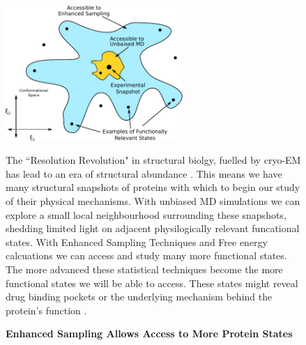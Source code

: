 \begin{figure}
	\label{Enhanced_sampling_framework}
	\begin{center}
		\includegraphics[width=0.6\textwidth]{figures/opening/MD_accessibility.pdf}
	\end{center}
	\captionsetup{singlelinecheck = false, justification=raggedright}
	\caption[Enhanced Sampling Allows Access to More Protein States] {\textbf{Enhanced Sampling Allows Access to More Protein States}}{The ``Resolution Revolution" in structural biolgy, fuelled by cryo-EM has lead to an era of structural abundance \cite{kuhlbrandt2014}. This means we have many structural snapshots of proteins with which to begin our study of their physical mechanisms. With unbiased MD simulations we can explore a small local neighbourhood surrounding these snapshots, shedding limited light on adjacent physilogically relevant funcational states. With Enhanced Sampling Techniques and Free energy calcuations we can access and study many more functional states. The more advanced these statistical techniques become the more functional states we will be able to access. These states might reveal drug binding pockets or the underlying mechanism behind the protein's function \cite{}. }
\end{figure}

